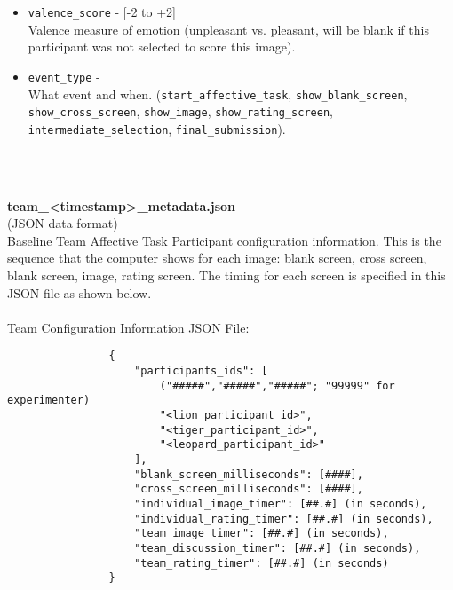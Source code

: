 \begin{description}
\begin{addmargin}[0em]{0em}
\begin{addmargin}[1em]{0em}
\begin{itemize}
                \item \verb|valence_score| - [-2 to +2]\\Valence measure of emotion (unpleasant vs. pleasant, will be blank if this participant was not selected to score this image).
                \item \verb|event_type| -\\What event and when.
                    (\verb|start_affective_task|, \verb|show_blank_screen|,
                    \verb|show_cross_screen|, \verb|show_image|, \verb|show_rating_screen|,
                    \verb|intermediate_selection|, \verb|final_submission|).
            \end{itemize}
        \end{addmargin} %


        \textbf{\\\\}
        \begin{addmargin}[1em]{0em} %
            \label{team_<timestamp>_metadata.json}
            \textbf{team\_<timestamp>\_metadata.json}\\(JSON data format)\\
            Baseline Team Affective Task Participant configuration information.
            This is the sequence that the computer shows for each image: blank screen, cross screen, blank screen, image, rating screen.
            The timing for each screen is specified in this JSON file as shown below.\\\\
            Team Configuration Information JSON File:
            \begin{verbatim}
                {
                    "participants_ids": [
                        ("#####","#####","#####"; "99999" for experimenter)
                        "<lion_participant_id>",
                        "<tiger_participant_id>",
                        "<leopard_participant_id>"
                    ],
                    "blank_screen_milliseconds": [####],
                    "cross_screen_milliseconds": [####],
                    "individual_image_timer": [##.#] (in seconds),
                    "individual_rating_timer": [##.#] (in seconds),
                    "team_image_timer": [##.#] (in seconds),
                    "team_discussion_timer": [##.#] (in seconds),
                    "team_rating_timer": [##.#] (in seconds)
                }
            \end{verbatim}
        \end{addmargin} %


\end{addmargin}
\end{description}
